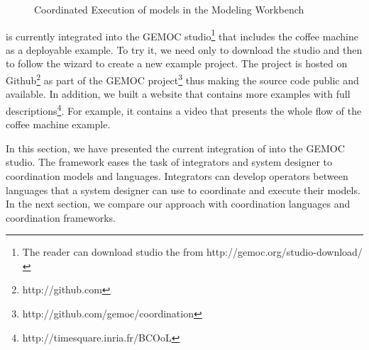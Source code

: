 \begin{figure}[h]
	\centering
	\caption[]{Coordinated Execution of models in the Modeling Workbench}
	\label{fig:subfigureExample1}
\end{figure}

\bcool is currently integrated into the GEMOC studio\footnote{The reader can download studio the from http://gemoc.org/studio-download/} that includes the coffee machine as a deployable example. To try it, we need only to download the studio and then to follow the wizard to create a new example project. The project \bcool is hosted on Github\footnote{http://github.com} as part of the GEMOC project\footnote{http://github.com/gemoc/coordination} thus making the source code public and available. In addition, we built a website that contains more examples with full descriptions\footnote{http://timesquare.inria.fr/BCOoL}. For example, it contains a video that presents the whole flow of the coffee machine example. 

In this section, we have presented the current integration of \bcool into the GEMOC studio. The framework eases the task of integrators and system designer to coordination models and languages. Integrators can develop operators between languages that a system designer can use to coordinate and execute their models. In the next section, we compare our approach with coordination languages and coordination frameworks.  

